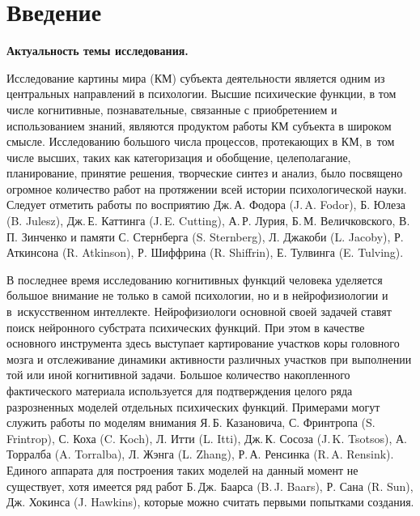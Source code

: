 \chapter*{Введение}							%
\textbf{Актуальность темы исследования.} 

Исследование картины мира (КМ) субъекта деятельности является одним из центральных направлений в психологии. Высшие психические функции, в том числе когнитивные, познавательные, связанные с приобретением и использованием знаний, являются продуктом работы КМ субъекта в широком смысле. Исследованию большого числа процессов, протекающих в КМ, в~том числе высших, таких как категоризация и обобщение, целеполагание, планирование, принятие решения, творческие синтез и анализ, было посвящено огромное количество работ на протяжении всей истории психологической науки. Следует отметить работы по восприятию Дж.\,А. Фодора (J.\,A. Fodor), Б. Юлеза (B. Julesz), Дж.\,Е. Каттинга (J.\,E. Cutting), А.\,Р. Лурия, Б.\,М. Величковского, В.\,П. Зинченко и памяти С. Стернберга (S. Sternberg), Л. Джакоби (L. Jacoby), Р. Аткинсона (R. Atkinson), Р. Шиффрина (R. Shiffrin), Е. Тулвинга (E. Tulving).

В последнее время исследованию когнитивных функций человека уделяется большое внимание не только в самой психологии, но и в нейрофизиологии и в~искусственном интеллекте. Нейрофизиологи основной своей задачей ставят поиск нейронного субстрата психических функций. При этом в качестве основного инструмента здесь выступает картирование участков коры головного мозга и отслеживание динамики активности различных участков при выполнении той или иной когнитивной задачи. Большое количество накопленного фактического материала используется для подтверждения целого ряда разрозненных моделей отдельных психических функций. Примерами могут служить работы по моделям внимания Я.\,Б. Казановича, С. Фринтропа (S. Frintrop), С. Коха (C. Koch), Л. Итти (L. Itti), Дж.\,К. Сосоза (J.\,K. Tsotsos), А. Торралба (A. Torralba), Л. Жэнга (L. Zhang), Р.\,А. Ренсинка (R.\,A. Rensink). Единого аппарата для построения таких моделей на данный момент не существует, хотя имеется ряд работ Б.\,Дж. Баарса (B.\,J. Baars), Р. Сана (R. Sun), Дж. Хокинса (J. Hawkins), которые можно считать первыми попытками создания.

